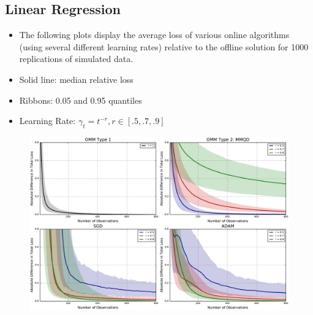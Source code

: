 \documentclass{beamer}
\begin{document}
\subsection{Linear Regression}
\begin{frame}
  \begin{itemize}
    \item The following plots display the average loss of various online algorithms (using several different learning rates) relative to the offline solution for 1000 replications of simulated data.
    \item Solid line: median relative loss
    \item Ribbons: 0.05 and 0.95 quantiles
  \end{itemize}
\end{frame}
\begin{frame}
  \begin{itemize}
    \item Learning Rate: $\gamma_t = t^{-r}, r\in[.5, .7, .9]$
  \end{itemize}
  \begin{figure}
    \includegraphics[width=\textwidth]{figures/linregmm_simulation.pdf}
  \end{figure}
\end{frame}
\end{document}
